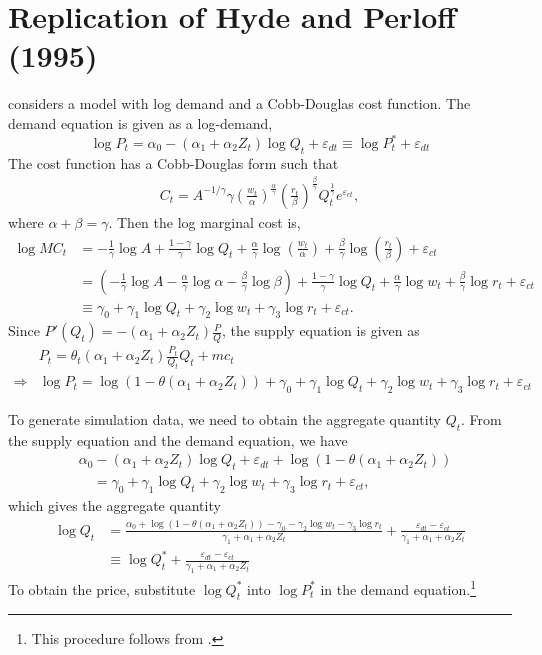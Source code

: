 \documentclass[11pt, a4paper]{article}
\numberwithin{figure}{section}
\theoremstyle{definition}
\newcommand{\0}{\mathbf{0}}
\begin{document}
\section{Replication of Hyde and Perloff (1995)}
\citet{hyde1995can} considers a model with log demand and a Cobb-Douglas cost function. 
The demand equation is given as a log-demand, 
\[\log P_{t} = \alpha_0 - (\alpha_1 + \alpha_2 Z_t) \log Q_t + \varepsilon_{dt} \equiv \log P_t^* + \varepsilon_{dt}\]
The cost function has a Cobb-Douglas form such that 
\begin{align*}
    C_t = A^{-1/\gamma} \gamma \left(\frac{w_t}{\alpha}\right)^{\frac{\alpha}{\gamma}} \left(\frac{r_t}{\beta}\right)^{\frac{\beta}{\gamma}} Q_t^{\frac{1}{\gamma}}e^{\varepsilon_{ct}},
\end{align*}
where $\alpha + \beta = \gamma$.
Then the log marginal cost is,
\begin{align*}
    \log MC_t &= -\frac{1}{\gamma}\log A + \frac{1-\gamma}{\gamma}\log Q_t + \frac{\alpha}{\gamma} \log \left(\frac{w_t}{\alpha}\right) + \frac{\beta}{\gamma} \log \left(\frac{r_t}{\beta}\right) + \varepsilon_{ct}\\
        & = \left( -\frac{1}{\gamma}\log A - \frac{\alpha}{\gamma}\log \alpha -  \frac{\beta}{\gamma}\log\beta    \right) + \frac{1-\gamma}{\gamma}\log Q_t + \frac{\alpha}{\gamma} \log w_t + \frac{\beta}{\gamma} \log r_t + \varepsilon_{ct} \\
        &\equiv \gamma_0 + \gamma_1 \log Q_t +  \gamma_2 \log w_t + \gamma_3 \log r_t + \varepsilon_{ct}.
\end{align*}
Since $P'(Q_t) = - (\alpha_1 + \alpha_2 Z_t) \frac{P}{Q} $,  the supply equation is given as
\begin{align*}
    &P_t = \theta_t (\alpha_1 + \alpha_2 Z_t) \frac{P_t}{Q_t} Q_t + mc_t\\
    \Longrightarrow &\log P_t  = \log(1 - \theta(\alpha_1 + \alpha_2 Z_t)) + \gamma_0 + \gamma_1 \log Q_t +  \gamma_2 \log w_t + \gamma_3 \log r_t + \varepsilon_{ct}
\end{align*}

To generate simulation data, we need to obtain the aggregate quantity $Q_t$.
From the supply equation and the demand equation, we have
\begin{align*}
   &\alpha_0 - (\alpha_1 + \alpha_2 Z_t)\log Q_t + \varepsilon_{dt} + \log (1 - \theta (\alpha_1 + \alpha_2 Z_t))\\
   &\quad = \gamma_0 + \gamma_1 \log Q_t +  \gamma_2 \log w_t + \gamma_3 \log r_t + \varepsilon_{ct},
\end{align*}
which gives the aggregate quantity 
\begin{align*}
    \log Q_t &= \frac{ \alpha_0 + \log (1 - \theta (\alpha_1 + \alpha_2 Z_t)) - \gamma_0  -  \gamma_2 \log w_t - \gamma_3 \log r_t}{\gamma_1+ \alpha_1 + \alpha_2 Z_t} + \frac{\varepsilon_{dt} - \varepsilon_{ct}}{\gamma_1+ \alpha_1 + \alpha_2 Z_t}\\
    &\equiv \log Q_t^* + \frac{\varepsilon_{dt} - \varepsilon_{ct}}{\gamma_1+ \alpha_1 + \alpha_2 Z_t}
\end{align*}
To obtain the price, substitute $\log Q_t^*$ into $\log P_t^*$ in the demand equation.\footnote{This procedure follows from \citet{perloff2012collinearity}.}
\end{document}

